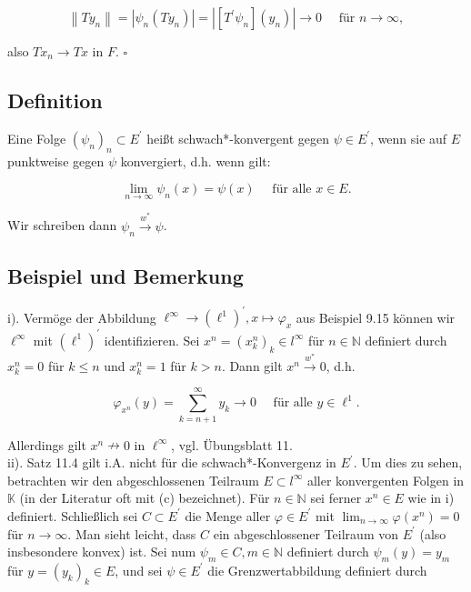 \documentclass[10pt, letterpaper]{article}
\begin{document}
$$
\left\|T y_{n}\right\|=\left|\psi_{n}\left(T y_{n}\right)\right|=\left|\left[T^{\prime} \psi_{n}\right]\left(y_{n}\right)\right| \rightarrow 0 \quad \text { für } n \rightarrow \infty,
$$

also $T x_{n} \rightarrow T x$ in $F$. \(\square\)

\subsection*{Definition}
Eine Folge $\left(\psi_{n}\right)_{n} \subset E^{\prime}$ heißt schwach*-konvergent gegen $\psi \in E^{\prime}$, wenn sie auf $E$ punktweise gegen $\psi$ konvergiert, d.h. wenn gilt:

$$
\lim _{n \rightarrow \infty} \psi_{n}(x)=\psi(x) \quad \text { für alle } x \in E .
$$

Wir schreiben dann $\psi_{n} \xrightarrow{w^{*}} \psi$.

\subsection*{Beispiel und Bemerkung}
i). Vermöge der Abbildung $\ell^{\infty} \rightarrow\left(\ell^{1}\right)^{\prime}, x \mapsto \varphi_{x}$ aus Beispiel 9.15 können wir $\ell^{\infty}$ mit $\left(\ell^{1}\right)^{\prime}$ identifizieren. Sei $x^{n}=\left(x_{k}^{n}\right)_{k} \in l^{\infty}$ für $n \in \mathbb{N}$ definiert durch $x_{k}^{n}=0$ für $k \leq n$ und $x_{k}^{n}=1$ für $k>n$. Dann gilt $x^{n} \xrightarrow{w^{*}} 0$, d.h.

$$
\varphi_{x^{n}}(y)=\sum_{k=n+1}^{\infty} y_{k} \rightarrow 0 \quad \text { für alle } y \in \ell^{1} .
$$

Allerdings gilt $x^{n} \nrightarrow 0$ in $\ell^{\infty}$, vgl. Übungsblatt 11.\\
ii). Satz 11.4 gilt i.A. nicht für die schwach*-Konvergenz in $E^{\prime}$. Um dies zu sehen, betrachten wir den abgeschlossenen Teilraum $E \subset l^{\infty}$ aller konvergenten Folgen in $\mathbb{K}$ (in der Literatur oft mit (c) bezeichnet). Für $n \in \mathbb{N}$ sei ferner $x^{n} \in E$ wie in i) definiert. Schließlich sei $C \subset E^{\prime}$ die Menge aller $\varphi \in E^{\prime}$ mit $\lim _{n \rightarrow \infty} \varphi\left(x^{n}\right)=0$ für $n \rightarrow \infty$. Man sieht leicht, dass $C$ ein abgeschlossener Teilraum von $E^{\prime}$ (also insbesondere konvex) ist. Sei num $\psi_{m} \in C, m \in \mathbb{N}$ definiert durch $\psi_{m}(y)=y_{m}$ für $y=\left(y_{k}\right)_{k} \in E$, und sei $\psi \in E^{\prime}$ die Grenzwertabbildung definiert durch
\end{document}
